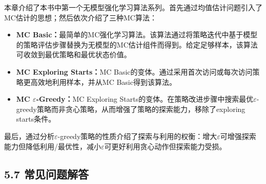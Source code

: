 \documentclass[UTF8]{article}
\begin{document}
本章介绍了本书中第一个无模型强化学习算法系列。首先通过均值估计问题引入了MC估计的思想；然后依次介绍了三种MC算法：

\begin{itemize}
    \item \textbf{MC Basic：}最简单的MC强化学习算法。该算法通过将策略迭代中基于模型的策略评估步骤替换为无模型的MC估计组件而得到。给定足够样本，该算法可收敛到最优策略和最优状态价值。

    \item \textbf{MC Exploring Starts：}MC Basic的变体。通过采用首次访问或每次访问策略更高效地利用样本，并从MC Basic得到该算法。

    \item \textbf{MC $\varepsilon$-Greedy：}MC Exploring Starts的变体。在策略改进步骤中搜索最优$\varepsilon$-greedy策略而非贪心策略，从而增强了策略的探索能力，移除了exploring starts条件。
\end{itemize}

最后，通过分析$\varepsilon$-greedy策略的性质介绍了探索与利用的权衡：增大$\varepsilon$可增强探索能力但降低利用/最优性，减小$\varepsilon$可更好利用贪心动作但探索能力受损。

\subsection*{5.7 常见问题解答}
\end{document}
